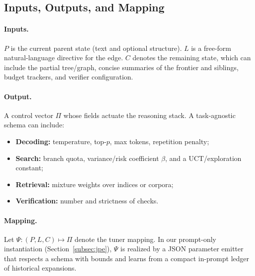 \documentclass{article}
\theoremstyle{plain}
\theoremstyle{definition}
\theoremstyle{remark}
\begin{document}
\subsection{Inputs, Outputs, and Mapping}
\paragraph{Inputs.} $P$ is the current parent state (text and optional structure). $L$ is a free-form natural-language directive for the edge. $C$ denotes the remaining state, which can include the partial tree/graph, concise summaries of the frontier and siblings, budget trackers, and verifier configuration.
\paragraph{Output.} A control vector $\Pi$ whose fields actuate the reasoning stack. A task-agnostic schema can include:
\begin{itemize}
  \item \textbf{Decoding:} temperature, top-$p$, max tokens, repetition penalty;
  \item \textbf{Search:} branch quota, variance/risk coefficient $\beta$, and a UCT/exploration constant;
  \item \textbf{Retrieval:} mixture weights over indices or corpora;
  \item \textbf{Verification:} number and strictness of checks.
\end{itemize}
\paragraph{Mapping.} Let $\Psi : (P,L,C)\mapsto \Pi$ denote the tuner mapping. In our prompt-only instantiation (Section~\ref{subsec:jpe}), $\Psi$ is realized by a JSON parameter emitter that respects a schema with bounds and learns from a compact in-prompt ledger of historical expansions.
\end{document}
